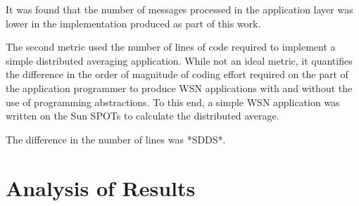 It was found that the number of messages processed in the application layer was
lower in the implementation produced as part of this work.


The second metric used the number of lines of code required to implement a
simple distributed averaging application. While not an ideal metric, it
quantifies the difference in the order of magnitude of coding effort required on
the part of the application programmer to produce WSN applications with and
without the use of programming abstractions. To this end, a simple WSN
application was written on the Sun SPOTs to calculate the distributed average.

The difference in the number of lines was *SDDS*.

\section{Analysis of Results}

